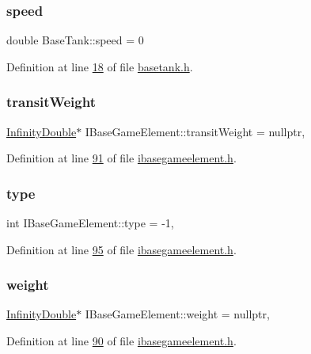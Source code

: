 \mbox{\label{a00157_a075d8661441062552aa5fb22f88ab023}} 
\subsubsection{\texorpdfstring{speed}{speed}}
{\footnotesize\ttfamily double Base\+Tank\+::speed = 0\hspace{0.3cm}{\ttfamily [protected]}}



Definition at line \hyperlink{a00041_source_l00018}{18} of file \hyperlink{a00041_source}{basetank.\+h}.

\mbox{\label{a00137_a865c937433f7d46665ca17e5adccd9df}} 
\subsubsection{\texorpdfstring{transit\+Weight}{transitWeight}}
{\footnotesize\ttfamily \hyperlink{a00161}{Infinity\+Double}$\ast$ I\+Base\+Game\+Element\+::transit\+Weight = nullptr\hspace{0.3cm}{\ttfamily [protected]}, {\ttfamily [inherited]}}



Definition at line \hyperlink{a00047_source_l00091}{91} of file \hyperlink{a00047_source}{ibasegameelement.\+h}.

\mbox{\label{a00137_a73a4ca23072b617f3d17004e3c671bca}} 
\subsubsection{\texorpdfstring{type}{type}}
{\footnotesize\ttfamily int I\+Base\+Game\+Element\+::type = -\/1\hspace{0.3cm}{\ttfamily [protected]}, {\ttfamily [inherited]}}



Definition at line \hyperlink{a00047_source_l00095}{95} of file \hyperlink{a00047_source}{ibasegameelement.\+h}.

\mbox{\label{a00137_a99901016531fd27b9b197dc88d3bfa4a}} 
\subsubsection{\texorpdfstring{weight}{weight}}
{\footnotesize\ttfamily \hyperlink{a00161}{Infinity\+Double}$\ast$ I\+Base\+Game\+Element\+::weight = nullptr\hspace{0.3cm}{\ttfamily [protected]}, {\ttfamily [inherited]}}



Definition at line \hyperlink{a00047_source_l00090}{90} of file \hyperlink{a00047_source}{ibasegameelement.\+h}.

